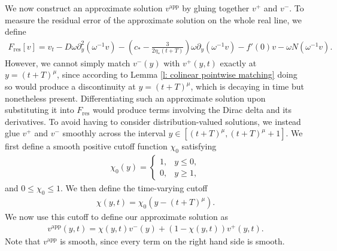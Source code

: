 \documentclass[11pt]{article}
\numberwithin{equation}{section}
\numberwithin{prop}{section}
\newcommand{\vapp}{v^\mathrm{app}}
\newcommand{\Fres}{F_\mathrm{res}}
\begin{document}
We now construct an approximate solution $v^\mathrm{app}$ by gluing together $v^+$ and $v^-$. To measure the residual error of the approximate solution on the whole real line, we define 
\begin{align}
\Fres [v] = v_t - D \omega \partial_y^2 (\omega^{-1} v) - \left( c_* - \frac{3}{2 \eta_* (t+T)} \right) \omega \partial_y (\omega^{-1} v) - f'(0) v - \omega N(\omega^{-1} v). \label{e: F res def}
\end{align}
However, we cannot simply match $v^-(y)$ with $v^+(y,t)$ exactly at $y = (t+T)^\mu$, since according to Lemma \ref{l: colinear pointwise matching} doing so would produce a discontinuity at $y = (t+T)^\mu$, which is decaying in time but nonetheless present. Differentiating such an approximate solution upon substituting it into $F_\mathrm{res}$ would produce terms involving the Dirac delta and its derivatives. To avoid having to consider distribution-valued solutions, we instead glue $v^+$ and $v^-$ smoothly across the interval $y \in [(t+T)^\mu, (t+T)^\mu +1]$. We first define a smooth positive cutoff function $\chi_0$ satisfying 
\begin{align}
\chi_0 (y) = \begin{cases}
1, & y \leq 0, \\
0, & y \geq 1,
\end{cases}
\end{align}
and $0 \leq \chi_0 \leq 1$. We then define the time-varying cutoff 
\begin{align}
\chi(y, t) = \chi_0 (y - (t+T)^\mu). \label{e: chi t def}
\end{align}
We now use this cutoff to define our approximate solution as 
\begin{align}
\vapp(y,t) = \chi(y,t) v^-(y) + (1-\chi(y,t)) v^+ (y,t).
\end{align}
Note that $\vapp$ is smooth, since every term on the right hand side is smooth. 
\end{document}
